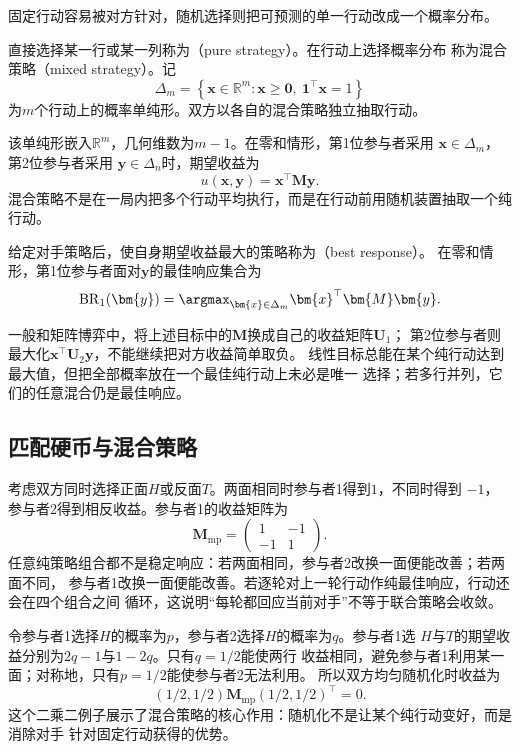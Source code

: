 固定行动容易被对方针对，随机选择则把可预测的单一行动改成一个概率分布。
\begin{definition}[纯策略与混合策略]
\label{def:game-pure-mixed-strategy}
直接选择某一行或某一列称为（pure strategy）。在行动上选择概率分布
称为混合策略（mixed strategy）。记
\[
  \Delta_m
  =
  \left\{
    \bm{x}\in\mathbb{R}^m:
    \bm{x}\geq\bm{0},\
    \bm{1}^{\top}\bm{x}=1
  \right\}
\]
为\(m\)个行动上的概率单纯形。双方以各自的混合策略独立抽取行动。
\end{definition}
该单纯形嵌入\(\mathbb{R}^m\)，几何维数为\(m-1\)。在零和情形，第1位参与者采用
\(\bm{x}\in\Delta_m\)，第2位参与者采用
\(\bm{y}\in\Delta_n\)时，期望收益为
\begin{equation}
  u(\bm{x},\bm{y})
  =
  \bm{x}^{\top}\bm{M}\bm{y}.
  \label{eq:game-matrix-expected-payoff}
\end{equation}
混合策略不是在一局内把多个行动平均执行，而是在行动前用随机装置抽取一个纯行动。

\begin{definition}[最佳响应]
\label{def:game-best-response}
给定对手策略后，使自身期望收益最大的策略称为（best response）。
在零和情形，第1位参与者面对\(\bm{y}\)的最佳响应集合为
\[
  \operatorname{BR}_1(\bm{y})
  =
  \argmax_{\bm{x}\in\Delta_m}
  \bm{x}^{\top}\bm{M}\bm{y}.
\]
\end{definition}
一般和矩阵博弈中，将上述目标中的$\bm M$换成自己的收益矩阵$\bm U_1$；
第2位参与者则最大化$\bm x^\top\bm U_2\bm y$，不能继续把对方收益简单取负。
线性目标总能在某个纯行动达到最大值，但把全部概率放在一个最佳纯行动上未必是唯一
选择；若多行并列，它们的任意混合仍是最佳响应。

\subsection{匹配硬币与混合策略}

考虑双方同时选择正面\(H\)或反面\(T\)。两面相同时参与者1得到\(1\)，不同时得到
\(-1\)，参与者2得到相反收益。参与者1的收益矩阵为
\[
  \bm{M}_{\mathrm{mp}}
  =
  \begin{pmatrix}
    1 & -1\\
    -1 & 1
  \end{pmatrix}.
\]
任意纯策略组合都不是稳定响应：若两面相同，参与者2改换一面便能改善；若两面不同，
参与者1改换一面便能改善。若逐轮对上一轮行动作纯最佳响应，行动还会在四个组合之间
循环，这说明“每轮都回应当前对手”不等于联合策略会收敛。

令参与者1选择\(H\)的概率为\(p\)，参与者2选择\(H\)的概率为\(q\)。参与者1选
\(H\)与\(T\)的期望收益分别为\(2q-1\)与\(1-2q\)。只有\(q=1/2\)能使两行
收益相同，避免参与者1利用某一面；对称地，只有\(p=1/2\)能使参与者2无法利用。
所以双方均匀随机化时收益为
\[
  (1/2,1/2)\bm{M}_{\mathrm{mp}}(1/2,1/2)^{\top}=0.
\]
这个二乘二例子展示了混合策略的核心作用：随机化不是让某个纯行动变好，而是消除对手
针对固定行动获得的优势。

